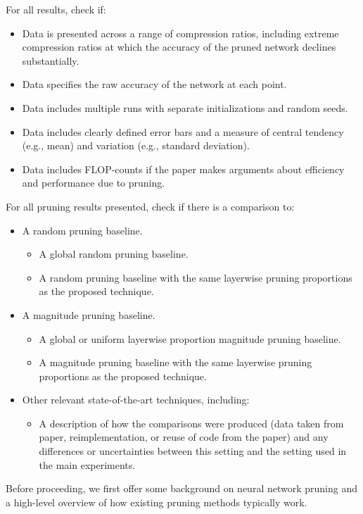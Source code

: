 \noindent For all results, check if:
\begin{itemize}
\item Data is presented across a range of compression ratios, including extreme compression ratios at which the accuracy of the pruned network declines substantially.
\item Data specifies the raw accuracy of the network at each point.
\item Data includes multiple runs with separate initializations and random seeds.
\item Data includes clearly defined error bars and a measure of central tendency (e.g., mean) and variation (e.g., standard deviation).
\item Data includes FLOP-counts if the paper makes arguments about efficiency and performance due to pruning.
\end{itemize}

\noindent For all pruning results presented, check if there is a comparison to:
\begin{itemize}
\item A random pruning baseline.
    \begin{itemize}
    \item A global random pruning baseline.
    \item A random pruning baseline with the same layerwise pruning proportions as the proposed technique.
    \end{itemize}
\item A magnitude pruning baseline.
    \begin{itemize}
    \item A global or uniform layerwise proportion magnitude pruning baseline.
    \item A magnitude pruning baseline with the same layerwise pruning proportions as the proposed technique.
    \end{itemize}
\item Other relevant state-of-the-art techniques, including:
    \begin{itemize}
    \item A description of how the comparisons were produced (data taken from paper, reimplementation, or reuse of code from the paper) and any differences or uncertainties between this setting and the setting used in the main experiments.
    \end{itemize}
\end{itemize}

\renewcommand{\algorithmicrequire}{\textbf{Input:}}
\label{sec:overview}
Before proceeding, we first offer some background on neural network pruning and a high-level overview of how existing pruning methods typically work.

